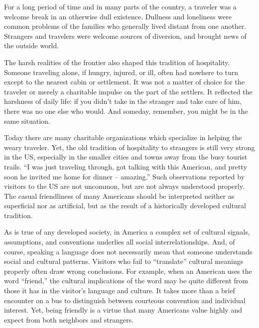 For a long period of time and in many parts of the country, a traveler was a welcome break in an otherwise dull existence. Dullness and loneliness were common problems of the families who generally lived distant from one another. Strangers and travelers were welcome sources of diversion, and brought news of the outside world.

The harsh realities of the frontier also shaped this tradition of hospitality. Someone traveling alone, if hungry, injured, or ill, often had nowhere to turn except to the nearest cabin or settlement. It was not a matter of choice for the traveler or merely a charitable impulse on the part of the settlers. It reflected the harshness of daily life: if you didn’t take in the stranger and take care of him, there was no one else who would. And someday, remember, you might be in the same situation.

Today there are many charitable organizations which specialize in helping the weary traveler. Yet, the old tradition of hospitality to strangers is still very strong in the US, especially in the smaller cities and towns away from the busy tourist trails. “I was just traveling through, got talking with this American, and pretty soon he invited me home for dinner -- amazing.” Such observations reported by visitors to the US are not uncommon, but are not always understood properly. The casual friendliness of many Americans should be interpreted neither as superficial nor as artificial, but as the result of a historically developed cultural tradition.

As is true of any developed society, in America a complex set of cultural signals, assumptions, and conventions underlies all social interrelationships. And, of course, speaking a language does not necessarily mean that someone understands social and cultural patterns. Visitors who fail to “translate” cultural meanings properly often draw wrong conclusions. For example, when an American uses the word “friend,” the cultural implications of the word may be quite different from those it has in the visitor’s language and culture. It takes more than a brief encounter on a bus to distinguish between courteous convention and individual interest. Yet, being friendly is a virtue that many Americans value highly and expect from both neighbors and strangers.

